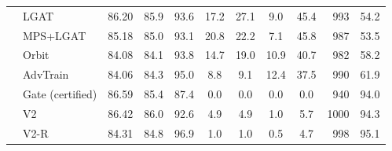 \begin{tabular}{@{}llcccccccrr@{}}
 & LGAT & 86.20 & 85.9 & 93.6 & 17.2 & 27.1 & 9.0 & 45.4 & 993 & 54.2 \\
 & MPS+LGAT & 85.18 & 85.0 & 93.1 & 20.8 & 22.2 & 7.1 & 45.8 & 987 & 53.5 \\
 & Orbit & 84.08 & 84.1 & 93.8 & 14.7 & 19.0 & 10.9 & 40.7 & 982 & 58.2 \\
 & AdvTrain & 84.06 & 84.3 & 95.0 & 8.8 & 9.1 & 12.4 & 37.5 & 990 & 61.9 \\
 & Gate (certified) & 86.59 & 85.4 & 87.4 & 0.0 & 0.0 & 0.0 & 0.0 & 940 & 94.0 \\
 & V2 & 86.42 & 86.0 & 92.6 & 4.9 & 4.9 & 1.0 & 5.7 & 1000 & 94.3 \\
 & V2-R & 84.31 & 84.8 & 96.9 & 1.0 & 1.0 & 0.5 & 4.7 & 998 & 95.1 \\
\bottomrule
\end{tabular}
